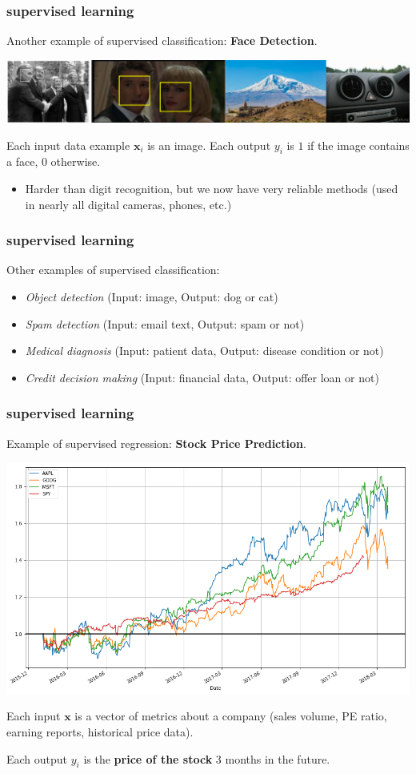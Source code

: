 \documentclass[handout,compress]{beamer}
\newcommand{\bv}[1]{\mathbf{#1}}
\begin{document}
\begin{frame}
	\frametitle{supervised learning}
	Another example of supervised classification: \textbf{Face Detection}.
	\begin{center}
		\includegraphics[width=.8\textwidth]{facedetection.png}
	\end{center}
	Each input data example $\bv{x}_i$ is an image. Each output $y_i$ is $1$ if the image contains a face, $0$ otherwise.
	
	\begin{itemize}
		\item Harder than digit recognition, but we now have very reliable methods (used in nearly all digital cameras, phones, etc.)
	\end{itemize}
\end{frame}

\begin{frame}
	\frametitle{supervised learning}
	Other examples of supervised classification:
	\begin{itemize}
		\item \emph{Object detection} (Input: image, Output: dog or cat)
		\item \emph{Spam detection} (Input: email text, Output: spam or not)
		\item \emph{Medical diagnosis} (Input: patient data, Output: disease condition or not)
		\item \emph{Credit decision making} (Input: financial data, Output: offer loan or not)
	\end{itemize}
	
\end{frame}

\begin{frame}
	\frametitle{supervised learning}
	 Example of supervised regression: \textbf{Stock Price Prediction}.
	\begin{center}
		\includegraphics[width=.5\textwidth]{stock_data.png}
	\end{center}
	Each input $\bv{x}$ is a vector of metrics about a company (sales volume, PE ratio, earning reports, historical price data). 
	
	Each output $y_i$ is the \textbf{price of the stock} 3 months in the future. 
\end{frame}
\end{document}
